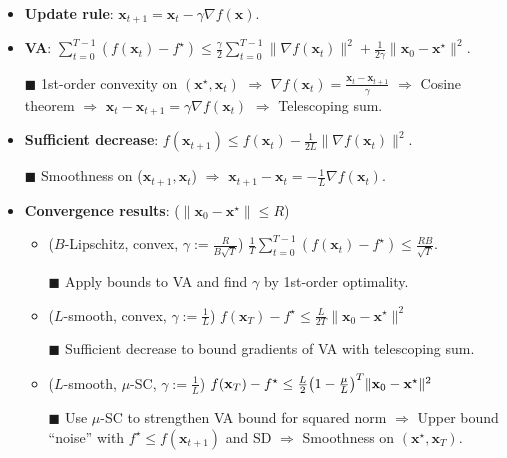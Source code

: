 \documentclass[a4paper]{article}
\newcommand{\lft}{\mathopen{}\mathclose\bgroup\left}
\newcommand{\rgt}{\aftergroup\egroup\right}
\renewcommand{\vec}[1]{\mathbf{#1}}
\newcommand{\proofsquare}{$\blacksquare$}
\newenvironment{topic}[1]
{\textbf{\sffamily \colorbox{black}{\rlap{\textbf{\textcolor{white}{#1}}}\hspace{\linewidth}\hspace{-2\fboxsep}}} \\ \vspace{0.2cm}}
{}
\begin{document}
\begin{multicols*}{2}
    \begin{topic}{Gradient descent}
        \begin{itemize}
            \item \textbf{Update rule}: $\vec{x}_{t+1} = \vec{x}_t - \gamma \nabla f(\vec{x})$.
            \item \textbf{VA}: $\sum_{t=0}^{T-1} (f(\vec{x}_t) - f^\star) \leq \frac{\gamma}{2} \sum_{t=0}^{T-1} \| \nabla f(\vec{x}_t) \|^2 + \frac{1}{2 \gamma} \| \vec{x}_0 - \vec{x}^\star \|^2$.
            \item[\proofsquare] 1st-order convexity on $(\vec{x}^\star, \vec{x}_t)$ $\Rightarrow$ $\nabla f(\vec{x}_t) = \frac{\vec{x}_t - \vec{x}_{t+1}}{\gamma}$ $\Rightarrow$ Cosine theorem $\Rightarrow$ $\vec{x}_t - \vec{x}_{t+1} = \gamma \nabla f(\vec{x}_t)$ $\Rightarrow$ Telescoping sum.
            \item \textbf{Sufficient decrease}: $f(\vec{x}_{t+1}) \leq f(\vec{x}_t) - \frac{1}{2L} \| \nabla f(\vec{x}_t) \|^2$.
            \item[\proofsquare] Smoothness on ($\vec{x}_{t+1}, \vec{x}_t$) $\Rightarrow$ $\vec{x}_{t+1} - \vec{x}_t = -\frac{1}{L} \nabla f(\vec{x}_t)$.
            \item \textbf{Convergence results}: ($\| \vec{x}_0 - \vec{x}^\star \| \leq R$)
                  \begin{itemize}
                      \item ($B$-Lipschitz, convex, $\gamma := \frac{R}{B \sqrt{T}}$) $\frac{1}{T} \sum_{t=0}^{T-1} (f(\vec{x}_t) - f^\star) \leq \frac{RB}{\sqrt{T}}$.
                      \item[\proofsquare] Apply bounds to VA and find $\gamma$ by 1st-order optimality.
                      \item ($L$-smooth, convex, $\gamma := \frac{1}{L}$) $f(\vec{x}_T) - f^\star \leq \frac{L}{2T} \| \vec{x}_0 - \vec{x}^\star \|^2$
                      \item[\proofsquare] Sufficient decrease to bound gradients of VA with telescoping sum.
                      \item ($L$-smooth, $\mu$-SC, $\gamma := \frac{1}{L}$) $f(\vec{x}_T) - f^\star \leq \frac{L}{2} \lft( 1 - \frac{\mu}{L} \rgt)^T \| \vec{x}_0 - \vec{x}^\star \|^2$
                      \item[\proofsquare] Use $\mu$-SC to strengthen VA bound for squared norm $\Rightarrow$ Upper bound ``noise'' with $f^\star \leq f(\vec{x}_{t+1})$ and SD $\Rightarrow$ Smoothness on $(\vec{x}^\star, \vec{x}_T)$.
                  \end{itemize}
        \end{itemize}
    \end{topic}


\end{multicols*}
\end{document}
